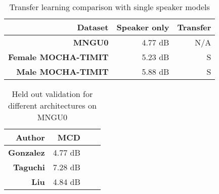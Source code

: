\documentclass[a4paper]{article}
\begin{document}
\begin{table}[th]
  \caption{Transfer learning comparison with single speaker models}
  \label{tab:transfer}
  \centering
  \footnotesize

  \begin{tabular}{ r r r}
    \toprule
    \textbf{Dataset} & \textbf{Speaker only} & \textbf{Transfer} \\
    \midrule
    \textbf{MNGU0} & 4.77 dB & N/A \\
    \textbf{Female MOCHA-TIMIT} & 5.23 dB & S \\
    \textbf{Male MOCHA-TIMIT} & 5.88 dB & S \\
    \bottomrule
  \end{tabular}
\end{table}

\begin{table}[th]
  \caption{Held out validation for different architectures on MNGU0}
  \label{tab:example}
  \centering
  \footnotesize

  \begin{tabular}{ r r r r }
    \toprule
    \textbf{Author} & \textbf{MCD} \\
    \midrule
    \textbf{Gonzalez} & 4.77 dB \\
    \textbf{Taguchi} & 7.28 dB \\
    \textbf{Liu} & 4.84 dB \\
    \bottomrule
  \end{tabular}
\end{table}
\end{document}
